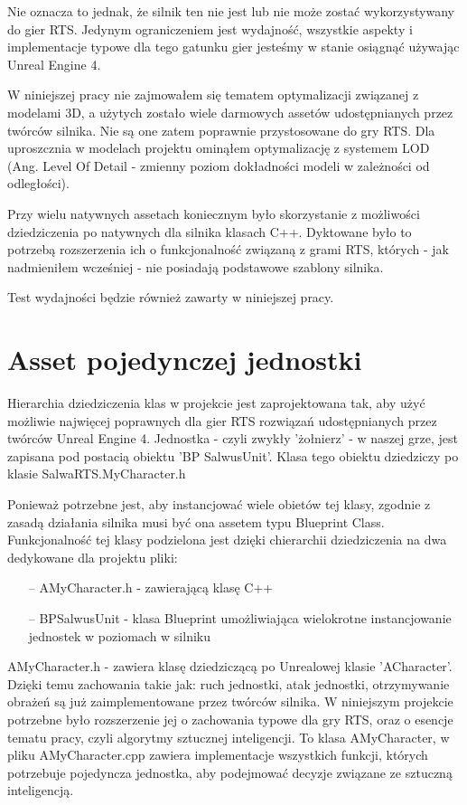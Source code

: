 \documentclass[12pt]{report}
\begin{document}
Nie oznacza to jednak, że silnik ten nie jest lub nie może zostać wykorzystywany do gier RTS. Jedynym ograniczeniem jest wydajność, wszystkie aspekty i implementacje typowe dla tego gatunku gier jesteśmy w stanie osiągnąć używając Unreal Engine 4. 

W niniejszej pracy nie zajmowałem się tematem optymalizacji związanej z modelami 3D, a użytych zostało wiele darmowych assetów udostępnianych przez twórców silnika. Nie są one zatem poprawnie przystosowane do gry RTS. Dla uproszcznia w modelach projektu ominąłem optymalizację z systemem LOD (Ang. Level Of Detail - zmienny poziom dokładności modeli w zależności od odległości). 

Przy wielu natywnych assetach koniecznym było skorzystanie z możliwości dziedziczenia po natywnych dla silnika klasach C++. Dyktowane było to potrzebą rozszerzenia ich o funkcjonalność związaną z grami RTS, których - jak nadmieniłem wcześniej - nie posiadają podstawowe szablony silnika.


Test wydajności będzie również zawarty w niniejszej pracy.

\section{Asset pojedynczej jednostki}

Hierarchia dziedziczenia klas w projekcie jest zaprojektowana tak, aby użyć możliwie najwięcej poprawnych dla gier RTS rozwiązań udostępnianych przez twórców Unreal Engine 4. Jednostka - czyli zwykły 'żołnierz' - w naszej grze, jest zapisana pod postacią obiektu 'BP SalwusUnit'. Klasa tego obiektu dziedziczy po klasie SalwaRTS.MyCharacter.h

Ponieważ potrzebne jest, aby instancjować wiele obietów tej klasy, zgodnie z zasadą działania silnika musi być ona assetem typu Blueprint Class. Funkcjonalność tej klasy podzielona jest dzięki chierarchii dziedziczenia na dwa dedykowane dla projektu pliki: 
\begin{itemize}
\item[--] AMyCharacter.h - zawierającą klasę C++
\item[--] BPSalwusUnit - klasa Blueprint umożliwiająca wielokrotne instancjowanie jednostek w poziomach w silniku
\end{itemize}

AMyCharacter.h - zawiera klasę dziedziczącą po Unrealowej klasie 'ACharacter'. Dzięki temu zachowania takie jak: ruch jednostki, atak jednostki, otrzymywanie obrażeń są już zaimplementowane przez twórców silnika. W niniejszym projekcie potrzebne było rozszerzenie jej o zachowania typowe dla gry RTS, oraz o esencje tematu pracy, czyli algorytmy sztucznej inteligencji. To klasa AMyCharacter, w pliku AMyCharacter.cpp zawiera implementacje wszystkich funkcji, których potrzebuje pojedyncza jednostka, aby podejmować decyzje związane ze sztuczną inteligencją.
\end{document}
